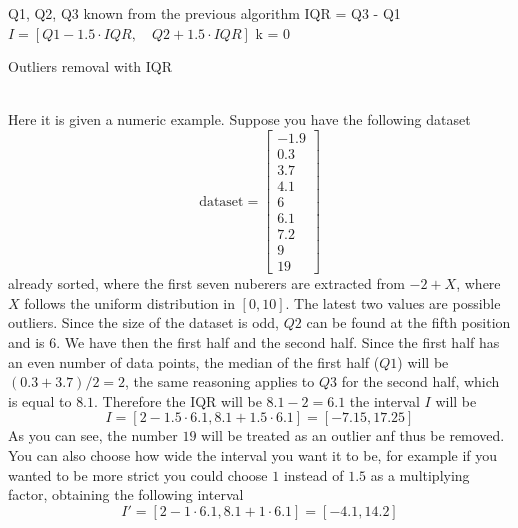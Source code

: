 \documentclass[12pt,twoside]{report}
\begin{document}
\begin{algorithm}[H]
\SetAlgoLined
{}
Q1, Q2, Q3 known from the previous algorithm\;
IQR = Q3 - Q1\;
$I=[Q1-1.5\cdot IQR,\quad Q2 + 1.5\cdot IQR]$\;
k = 0\;
 \caption{Outliers removal with IQR}
\end{algorithm}
\noindent \\Here it is given a numeric example. Suppose you have the following dataset 
$$
\text{dataset}=\begin{bmatrix}
-1.9\\ 
0.3\\ 
3.7\\
4.1\\
6\\
6.1\\
7.2\\
9\\
19
\end{bmatrix}
$$
already sorted, where the first seven nuberers are extracted from $-2+X$, where $X$ follows the uniform distribution in $[0,10]$. The latest two values are possible outliers. Since the size of the dataset is odd, $Q2$ can be found at the fifth position and is $6$. We have then the first half and the second half. Since the first half has an even number of data points, the median of the first half ($Q1$) will be $(0.3+3.7)/2=2$, the same reasoning applies to $Q3$ for the second half, which is equal to $8.1$. Therefore the IQR will be $8.1-2=6.1$ the interval $I$ will be
$$I=[2-1.5\cdot6.1,8.1+1.5\cdot6.1]=[-7.15,17.25]$$
As you can see, the number $19$ will be treated as an outlier anf thus be removed. You can also choose how wide the interval you want it to be, for example if you wanted to be more strict you could choose $1$ instead of $1.5$ as a multiplying factor, obtaining the following interval
$$I'=[2-1\cdot6.1,8.1+1\cdot6.1]=[-4.1,14.2]$$
\end{document}

